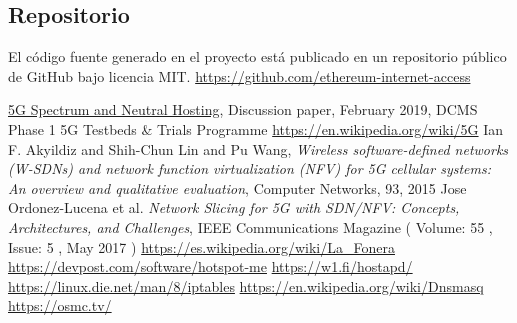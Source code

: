 \documentclass[12pt]{amsart}
\begin{document}
\begin{multicols}{2}
\section{Repositorio}\label{sec:repository}
El código fuente generado en el proyecto está publicado en un repositorio público de GitHub bajo licencia MIT.
\newline\newline
\url{https://github.com/ethereum-internet-access}
\newline
\begin{thebibliography}{9}
  \href{https://uk5g.org/media/uploads/resource_files/Spectrum\_NH\_discussion\_paper\_20Feb19.pdf}{5G Spectrum and Neutral Hosting}, Discussion paper, February 2019,
  DCMS Phase 1 5G Testbeds \& Trials Programme
 \href{https://en.wikipedia.org/wiki/5G}{https://en.wikipedia.org/wiki/5G}
 Ian F. Akyildiz and Shih-Chun Lin and Pu Wang,
  \textit{Wireless software-defined networks (W-SDNs) and network function virtualization (NFV) for 5G cellular systems:
    An overview and qualitative evaluation}, Computer Networks, 93, 2015
 Jose Ordonez-Lucena et al.
  \textit{Network Slicing for 5G with SDN/NFV: Concepts, Architectures, and Challenges},
   IEEE Communications Magazine ( Volume: 55 , Issue: 5 , May 2017 )
 \href{https://es.wikipedia.org/wiki/La_Fonera}{https://es.wikipedia.org/wiki/La\_Fonera}
 \href{https://devpost.com/software/hotspot-me}{https://devpost.com/software/hotspot-me}
 \href{https://w1.fi/hostapd/}{https://w1.fi/hostapd/}
 \href{https://linux.die.net/man/8/iptables}{https://linux.die.net/man/8/iptables}
 \href{https://en.wikipedia.org/wiki/Dnsmasq}{https://en.wikipedia.org/wiki/Dnsmasq}
 \href{https://osmc.tv/}{https://osmc.tv/}




\end{thebibliography}
\end{multicols}
\end{document}
